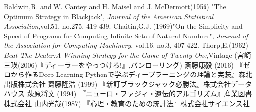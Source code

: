 \begin{thebibliography}{9}
   Baldwin,R. and W. Cantey and H. Maisel and J. McDermott(1956) "The Optimum Strategy in Blackjack", {\it{Journal of the American Statistical Association}},vol.51, no.275, 419-439.
   Chaitin,G.J. (1969)"On the Simplicity and Speed of Programs for Computing Infinite Sets of Natural Numbers", {\it{Journal of the Association for Computing Machinery}}, vol.16, no.3, 407-422.
   Thorp,E.(1962) {\it{Beat The Dealer:A Winning Strategy for the Game of Twenty One}},Vintage (宮崎三瑛(2006)『ディーラーをやっつけろ!』,パンローリング)
   斎藤康毅 (2016) 『ゼロから作るDeep Learning Pythonで学ぶディープラーニングの理論と実装』森北出版株式会社
   齋藤隆浩 (1999) 『新訂ブラックジャック必勝法』株式会社データハウス
   萩原将文 (1994) 『ニューロ・ファジィ・遺伝的アルゴリズム』産業図書株式会社
   山内光哉(1987) 『心理・教育のための統計法』株式会社サイエンス社
\end{thebibliography}
